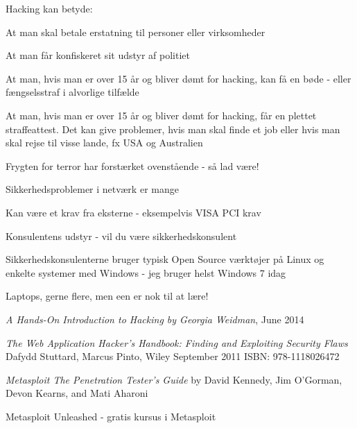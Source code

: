 \documentclass[Screen16to9,17pt]{foils}
\begin{document}
Hacking kan betyde:
\begin{list2}
\item At man skal betale erstatning til personer eller virksomheder
\item At man får konfiskeret sit udstyr af politiet
\item At man, hvis man er over 15 år og bliver dømt for hacking, kan
  få en bøde - eller fængselsstraf i alvorlige tilfælde
\item At man, hvis man er over 15 år og bliver dømt for hacking, får
en plettet straffeattest. Det kan give problemer, hvis man skal finde
et job eller hvis man skal rejse til visse lande, fx USA og
Australien
\item Frygten for terror har forstærket ovenstående - så lad være!
\end{list2}




\begin{list1}
\item Sikkerhedsproblemer i netværk er mange
\item Kan være et krav fra eksterne - eksempelvis VISA PCI krav
\end{list1}




\centerline{Konsulentens udstyr - vil du være sikkerhedskonsulent}

\begin{list1}
\item Sikkerhedskonsulenterne bruger typisk Open Source værktøjer på Linux og
enkelte systemer med Windows - jeg bruger helst Windows 7 idag
\item Laptops, gerne flere, men een er nok til at lære!
\begin{list2}
\item \emph{A Hands-On Introduction to Hacking
by Georgia Weidman}, June 2014\\
\item \emph{The Web Application Hacker's Handbook: Finding and Exploiting Security Flaws}
Dafydd Stuttard, Marcus Pinto, Wiley September 2011 ISBN: 978-1118026472
\item \emph{Metasploit The Penetration Tester's Guide}
by David Kennedy, Jim O'Gorman, Devon Kearns, and Mati Aharoni\\
\item Metasploit Unleashed - gratis kursus i Metasploit\\
\end{list2}
\end{list1}
\end{document}
